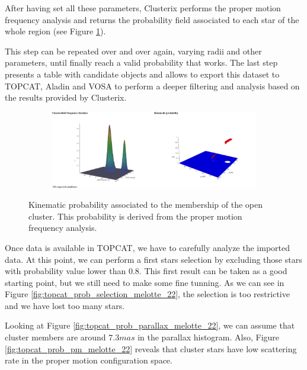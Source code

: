 \documentclass[11pt, a4paper, english]{book}
\begin{document}
After having set all these parameters,
Clusterix performs the proper motion frequency analysis and returns the probability field
associated to each star of the whole region (see Figure \ref{fig:clusterix_probability_melotte_22}).

This step can be repeated over and over again, varying radii and other parameters,
until finally reach a valid probability that works.
The last step presents a table with candidate objects and allows to export this dataset to TOPCAT,
Aladin and VOSA to perform a deeper filtering and analysis based on the results provided by Clusterix.

\begin{figure}[htbp]
  \centering
  \begin{subfigure}{0.9\textwidth}
    \centering
    \includegraphics[width=\textwidth]{../figures/clusterix/clusterix_probability_melotte_22.pdf}
  \end{subfigure}
  \caption{Kinematic probability associated to the membership of the open cluster.
           This probability is derived from the proper motion frequency analysis.}
  \label{fig:clusterix_probability_melotte_22}
\end{figure}

Once data is available in TOPCAT, we have to carefully analyze the imported data.
At this point, we can perform a first stars selection by excluding those stars with probability value lower than 0.8.
This first result can be taken as a good starting point, but we still need to make some fine tunning.
As we can see in Figure \ref{fig:topcat_prob_selection_melotte_22},
the selection is too restrictive and we have lost too many stars.

Looking at Figure \ref{fig:topcat_prob_parallax_melotte_22},
we can assume that cluster members are around $7.3mas$ in the parallax histogram.
Also, Figure \ref{fig:topcat_prob_pm_melotte_22} reveals that cluster stars
have low scattering rate in the proper motion configuration space.
\end{document}
